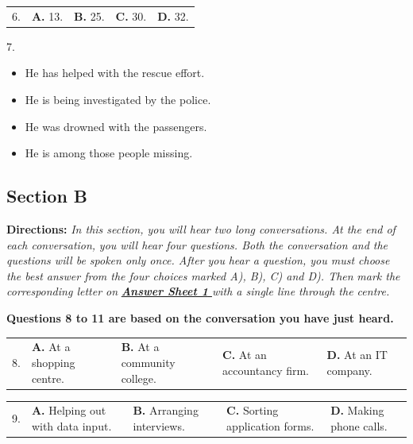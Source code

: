 \documentclass[UTF8,11pt]{ctexart}
\begin{document}
\noindent\begin{tabularx}{\linewidth}{@{}lXXXX@{}}6. & \textbf{A.} 13. & \textbf{B.} 25. & \textbf{C.} 30. & \textbf{D.} 32.\\\end{tabularx}\par

7.


\begin{itemize}[leftmargin=2em,itemsep=.2em,topsep=.4em]\item[A.] He has helped with the rescue effort.
\item[B.] He is being investigated by the police.
\item[C.] He was drowned with the passengers.
\item[D.] He is among those people missing.
\end{itemize}

\subsection*{\textbf{Section B}}


\textbf{Directions:}\textit{ In this section, you will hear two long conversations. At the end of each conversation,} \textit{you will hear four questions. Both the conversation and the questions will be spoken only once. After you} \textit{hear a question, you must choose the best answer from the four choices marked A), B), C) and D). Then} \textit{mark the corresponding letter on}\textbf{\textit{ }}\textbf{\textit{\uline{Answer Sheet 1}}}\textit{\uline{ }}\textit{with a single line through the centre.}


\textbf{Questions 8 to 11 are based on the conversation you have just heard.}


\noindent\begin{tabularx}{\linewidth}{@{}lXXXX@{}}8. & \textbf{A.} At a shopping centre. & \textbf{B.} At a community college. & \textbf{C.} At an accountancy firm. & \textbf{D.} At an IT company.\\\end{tabularx}\par

\noindent\begin{tabularx}{\linewidth}{@{}lXXXX@{}}9. & \textbf{A.} Helping out with data input. & \textbf{B.} Arranging interviews. & \textbf{C.} Sorting application forms. & \textbf{D.} Making phone calls.\\\end{tabularx}\par
\end{document}
